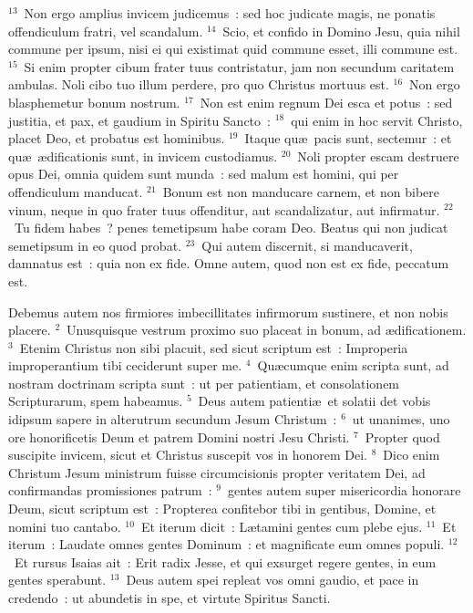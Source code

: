 ${}^{13}$~Non ergo amplius invicem judicemus~: sed hoc judicate magis, ne ponatis offendiculum fratri, vel scandalum.
${}^{14}$~Scio, et confido in Domino Jesu, quia nihil commune per ipsum, nisi ei qui existimat quid commune esset, illi commune est.
${}^{15}$~Si enim propter cibum frater tuus contristatur, jam non secundum caritatem ambulas. Noli cibo tuo illum perdere, pro quo Christus mortuus est.
${}^{16}$~Non ergo blasphemetur bonum nostrum.
${}^{17}$~Non est enim regnum Dei esca et potus~: sed justitia, et pax, et gaudium in Spiritu Sancto~:
${}^{18}$~qui enim in hoc servit Christo, placet Deo, et probatus est hominibus.
${}^{19}$~Itaque qu\ae\ pacis sunt, sectemur~: et qu\ae\ \ae dificationis sunt, in invicem custodiamus.
${}^{20}$~Noli propter escam destruere opus Dei, omnia quidem sunt munda~: sed malum est homini, qui per offendiculum manducat.
${}^{21}$~Bonum est non manducare carnem, et non bibere vinum, neque in quo frater tuus offenditur, aut scandalizatur, aut infirmatur.
${}^{22}$~Tu fidem habes~? penes temetipsum habe coram Deo. Beatus qui non judicat semetipsum in eo quod probat.
${}^{23}$~Qui autem discernit, si manducaverit, damnatus est~: quia non ex fide. Omne autem, quod non est ex fide, peccatum est.

\lettrine[lines=3,image=true,loversize=0.05,lraise=-0.03]{D}{}ebemus autem nos firmiores imbecillitates infirmorum sustinere, et non nobis placere.
${}^{2}$~Unusquisque vestrum proximo suo placeat in bonum, ad \ae dificationem.
${}^{3}$~Etenim Christus non sibi placuit, sed sicut scriptum est~: Improperia improperantium tibi ceciderunt super me.
${}^{4}$~Qu\ae cumque enim scripta sunt, ad nostram doctrinam scripta sunt~: ut per patientiam, et consolationem Scripturarum, spem habeamus.
${}^{5}$~Deus autem patienti\ae\ et solatii det vobis idipsum sapere in alterutrum secundum Jesum Christum~:
${}^{6}$~ut unanimes, uno ore honorificetis Deum et patrem Domini nostri Jesu Christi.
${}^{7}$~Propter quod suscipite invicem, sicut et Christus suscepit vos in honorem Dei.
${}^{8}$~Dico enim Christum Jesum ministrum fuisse circumcisionis propter veritatem Dei, ad confirmandas promissiones patrum~:
${}^{9}$~gentes autem super misericordia honorare Deum, sicut scriptum est~: Propterea confitebor tibi in gentibus, Domine, et nomini tuo cantabo.
${}^{10}$~Et iterum dicit~: L\ae tamini gentes cum plebe ejus.
${}^{11}$~Et iterum~: Laudate omnes gentes Dominum~: et magnificate eum omnes populi.
${}^{12}$~Et rursus Isaias ait~: Erit radix Jesse, et qui exsurget regere gentes, in eum gentes sperabunt.
${}^{13}$~Deus autem spei repleat vos omni gaudio, et pace in credendo~: ut abundetis in spe, et virtute Spiritus Sancti.



